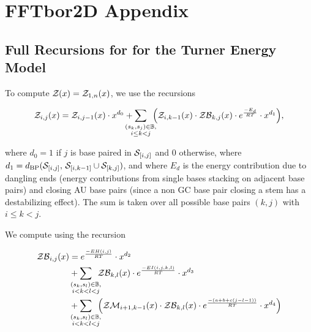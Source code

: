 
\chapter{FFTbor2D Appendix}
\label{ch:ffttwoapp}


\section{Full Recursions for \texorpdfstring{}{}
for the Turner Energy Model}
\label{sec:ffttwo:turner}

To compute ${\mathcal Z}_{}(x) = {\mathcal Z}_{1,n}(x)$, we use the recursions

\begin{align}
\label{eq:fftborapp:zx}
\emZ{i,j} = \emZ{i,j-1} \cdot x^{d_0} +
\sum_{\mathclap{\substack{(s_k,s_j) \in \bpSet, \\ i \leq k < j}}}\enspace
\Big( \emZ{i,k-1} \cdot \emZB{k,j} \cdot \boltzE{E_d} \cdot x^{d_1} \Big),
\end{align}

where $d_0 = 1$ if $j$ is base paired
in $\mathcal S_{[i,j]}$ and $0$ otherwise, where $d_1 =
d_{\text{BP}}(\mathcal S_{[i,j]},\,\mathcal S_{[i,k-1]} \cup \mathcal S_{[k,j]})$, and
where $E_d$ is the energy contribution due to dangling ends (energy
contributions from single bases stacking on adjacent base pairs) and
closing AU base pairs (since a non GC base pair closing a stem has a
destabilizing effect).  The sum is taken over all possible
base pairs $(k,j)$ with $i \le k < j$.

We compute \emZB{} using the recursion

\begin{align}
\label{eq:fftborapp:zbx}
\begin{split}
\emZB{i,j} &= \boltzE{EH(i,j)} \cdot x^{d_2} \\
&+ \sum_{\mathclap{\substack{(s_k,s_l) \in \bpSet, \\ i < k < l < j }}}\enspace
\emZB{k,l} \cdot \boltzE{EI(i,j,k,l)} \cdot x^{d_3} \\
&+ \sum_{\mathclap{\substack{(s_k,s_l) \in \bpSet, \\ i < k < l < j }}}\enspace
\Big( \emZM{i+1,k-1} \cdot \emZB{k,l} \cdot \boltzE{(a+b+c(j-l-1))}
\cdot x^{d_4} \Big)
\end{split}
\end{align}


